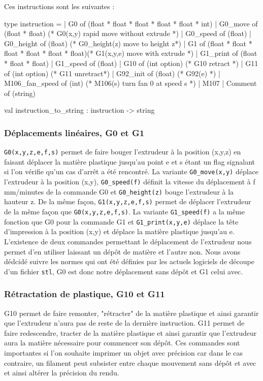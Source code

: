 \documentclass[11pt, titlepage]{article}
\begin{document}
Ces instructions sont les suivantes :
\begin{lstisting}
  type instruction =
  | G0 of (float * float * float * float * float * int)
  | G0_move of (float * float) (* G0(x,y) rapid move without extrude *)
  | G0_speed of (float)
  | G0_height of (float) (* G0_height(z) move to height z*)
  | G1 of (float * float * float * float * float * float)(* G1(x,y,e) move with extrude *)
  | G1_print of (float * float * float)
  | G1_speed of (float)
  | G10 of (int option) (* G10 retract *)
  | G11 of (int option) (* G11 unretract*)
  | G92_init of (float) (* G92(e) *)
  | M106_fan_speed of (int) (* M106(s) turn fan 0 at speed s *)
  | M107
  | Comment of (string)
  
  val instruction_to_string : instruction -> string
\end{lstisting}

    \subsubsection{Déplacements linéaires, G0 et G1}
	\verb&G0(x,y,z,e,f,s)& permet de faire bouger l'extrudeur à la position (x,y,z) en faisant déplacer la matière plastique jusqu'au point e et s étant un flag signalant si l'on vérifie qu'un cas d'arrêt a été rencontré. La variante \verb&G0_move(x,y)& déplace l'extrudeur à la position (x,y), \verb&G0_speed(f)& définit la vitesse du déplacement à f mm/minutes de la commande G0 et \verb&G0_height(z)& bouge l'extrudeur à la hauteur z.
De la même façon, \verb&G1(x,y,z,e,f,s)& permet de déplacer l'extrudeur de la même façon que \verb&G0(x,y,z,e,f,s)&. La variante \verb&G1_speed(f)& a la même fonction que G0 pour la commande G1 et \verb&G1_print(x,y,e)& déplace la tête d'impression à la position (x,y) et déplace la matière plastique jusqu'au e.
L'existence de deux commandes permettant le déplacement de l'extrudeur nous permet d'en utiliser laissant un dépôt de matière et l'autre non. Nous avons dédcidé suivre les normes qui ont été définies par les actuels logiciels de découpe d'un fichier \verb&stl&, G0 est donc notre déplacement sans dépôt et G1 celui avec.
	\subsubsection{Rétractation de plastique, G10 et G11}
	G10 permet de faire remonter, "rétracter" de la matière plastique et ainsi garantir que l'extrudeur n'aura pas de reste de la dernière instruction.
G11 permet de  faire redescendre, tracter de la matière plastique et ainsi garantir que l'extrudeur aura la matière nécessaire pour commencer son dépôt.
Ces commandes sont importantes si l'on souhaite imprimer un objet avec précision car dans le cas contraire, un filament peut subsister entre chaque mouvement sans dépôt et avec et ainsi altérer la précision du rendu.
\end{document}

